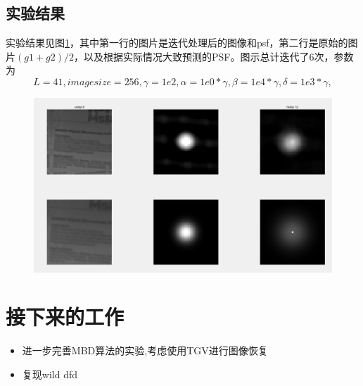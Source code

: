 \documentclass[UTF8]{ctexart}
\begin{document}
\begin{sloppypar}
        \subsection{实验结果}
        实验结果见图\ref{fig:mbdResult}，其中第一行的图片是迭代处理后的图像和psf，第二行是原始的图片$(g1+g2)/2$，以及根据实际情况大致预测的PSF。图示总计迭代了6次，参数为
        $$
        L = 41,
        image size = 256,
        \gamma = 1e2,
        \alpha = 1e0*\gamma,
        \beta = 1e4*\gamma,
        \delta = 1e3*\gamma,
        $$
        \begin{figure}[htbp]
            \includegraphics[width=0.9\linewidth]{figure/MBD}
            \label{fig:mbdResult}
        \end{figure}
        \section{接下来的工作}
        \begin{itemize}
            \item 进一步完善MBD算法的实验,考虑使用TGV进行图像恢复
            \item 复现wild dfd
        \end{itemize}




        
        
    \end{sloppypar}
\end{document}
